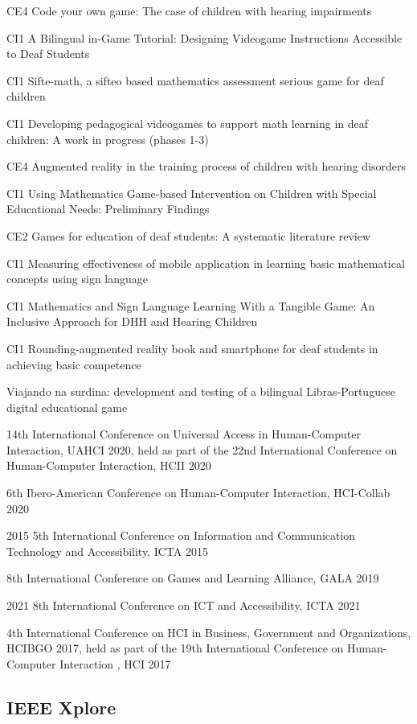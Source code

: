 CE4 Code your own game: The case of children with hearing impairments

CI1 A Bilingual in-Game Tutorial: Designing Videogame Instructions Accessible to Deaf Students

CI1 Sifte-math, a sifteo based mathematics assessment serious game for deaf children

CI1 Developing pedagogical videogames to support math learning in deaf children: A work in progress (phases 1-3)

CE4 Augmented reality in the training process of children with hearing disorders

CI1 Using Mathematics Game-based Intervention on Children with Special Educational Needs: Preliminary Findings

CE2 Games for education of deaf students: A systematic literature review

CI1 Measuring effectiveness of mobile application in learning basic mathematical concepts using sign language

CI1 Mathematics and Sign Language Learning With a Tangible Game: An Inclusive Approach for DHH and Hearing Children

CI1 Rounding-augmented reality book and smartphone for deaf students in achieving basic competence

Viajando na surdina: development and testing of a bilingual Libras-Portuguese digital educational game

14th International Conference on Universal Access in Human-Computer Interaction, UAHCI 2020, held as part of the 22nd International Conference on Human-Computer Interaction, HCII 2020

6th Ibero-American Conference on Human-Computer Interaction, HCI-Collab 2020

2015 5th International Conference on Information and Communication Technology and Accessibility, ICTA 2015

8th International Conference on Games and Learning Alliance, GALA 2019

2021 8th International Conference on ICT and Accessibility, ICTA 2021

4th International Conference on HCI in Business, Government and Organizations, HCIBGO 2017, held as part of the 19th International Conference on Human-Computer Interaction , HCI 2017

\subsection{IEEE Xplore}

